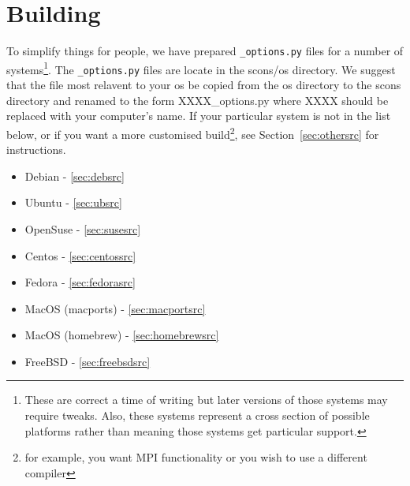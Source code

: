 









\section{Building}\label{sec:build}

To simplify things for people, we have prepared \texttt{_options.py} files for a number of 
systems\footnote{These are correct a time of writing but later versions of those systems may require tweaks. 
Also, these systems represent a cross section of possible platforms rather than meaning those systems get particular support.}.
The \texttt{_options.py} files are locate in the scons/os directory. We suggest that the file most relavent to your os 
be copied from the os directory to the scons directory and renamed to the form XXXX_options.py where XXXX should be replaced with your computer's name.
If your particular system is not in the list below, or if you want a more customised 
build\footnote{for example, you want MPI functionality or you wish to use a different compiler}, 
see Section~\ref{sec:othersrc} for instructions.
\begin{itemize}
 \item Debian - \ref{sec:debsrc}
 \item Ubuntu - \ref{sec:ubsrc}
 \item OpenSuse - \ref{sec:susesrc}
 \item Centos - \ref{sec:centossrc}
 \item Fedora - \ref{sec:fedorasrc}
 \item MacOS (macports) - \ref{sec:macportsrc}
 \item MacOS (homebrew) - \ref{sec:homebrewsrc}
 \item FreeBSD - \ref{sec:freebsdsrc}
\end{itemize}

